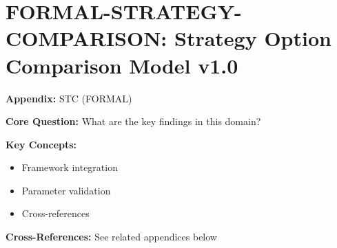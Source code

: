 
\chapter{FORMAL-STRATEGY-COMPARISON: Strategy Option Comparison Model v1.0}
\label{app:socm}


\begin{tcolorbox}[colback=blue!5!white, colframe=blue!75!black,
    title=Quick Reference: Appendix STC]

\textbf{Appendix:} STC (FORMAL)

\textbf{Core Question:} What are the key findings in this domain?

\textbf{Key Concepts:}
\begin{itemize}[nosep]
\item Framework integration
\item Parameter validation
\item Cross-references
\end{itemize}

\textbf{Cross-References:} See related appendices below
\end{tcolorbox}


\begin{abstract}
This appendix presents the Strategy Option Comparison Model v1.0 (SOCM), a theory-driven framework for evaluating and comparing strategic options within a company's portfolio. SOCM models strategic decision-making as a portfolio optimization problem where complementarity effects (γ parameters) between different strategic options directly impact organic growth. The model integrates six context factors ($\Psi$), six strategic evaluation dimensions (including explicit organic growth measurement), and ten complementarity parameters to predict which combinations of strategic options maximize organic growth. SOCM bridges strategic theory (Porter, Rumelt, BCG) with evidence-based decision-making, enabling companies to move beyond binary strategy choices toward dynamic portfolio combinations.
\end{abstract}


